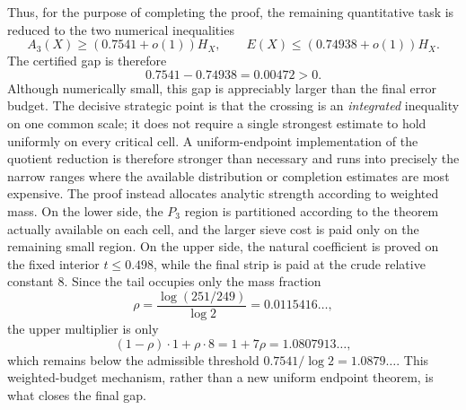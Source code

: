 \documentclass{aomart}
\theoremstyle{definition}
\newcommand{\1}{\mathbf 1}
\begin{document}
Thus, for the purpose of completing the proof, the remaining quantitative task is reduced to the two numerical inequalities
\begin{equation}\label{eq:goals}
 A_3(X)\ge (0.7541+o(1))H_X,
 \qquad
 E(X)\le (0.74938+o(1))H_X.
\end{equation}
The certified gap is therefore
\[
 0.7541-0.74938=0.00472>0.
\]
Although numerically small, this gap is appreciably larger than the final error budget.  The decisive strategic point is that the crossing is an \emph{integrated} inequality on one common scale; it does not require a single strongest estimate to hold uniformly on every critical cell.  A uniform-endpoint implementation of the quotient reduction is therefore stronger than necessary and runs into precisely the narrow ranges where the available distribution or completion estimates are most expensive.  The proof instead allocates analytic strength according to weighted mass.  On the lower side, the $P_3$ region is partitioned according to the theorem actually available on each cell, and the larger sieve cost is paid only on the remaining small region.  On the upper side, the natural coefficient is proved on the fixed interior $t\le0.498$, while the final strip is paid at the crude relative constant $8$.  Since the tail occupies only the mass fraction
\[
 \rho=\frac{\log(251/249)}{\log2}=0.0115416\ldots,
\]
the upper multiplier is only
\[
 (1-\rho)\cdot1+\rho\cdot8
 =1+7\rho=1.0807913\ldots,
\]
which remains below the admissible threshold $0.7541/\log2=1.0879\ldots$.  This weighted-budget mechanism, rather than a new uniform endpoint theorem, is what closes the final gap.
\end{document}
